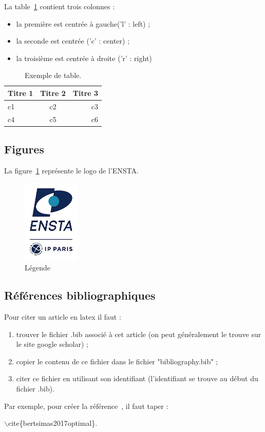 \documentclass[12pt]{report}
\begin{document}
La table~\ref{tab:ex} contient trois colonnes :
\begin{itemize}
\item la première est centrée à gauche('l' : left) ;
\item la seconde est centrée ('c' : center) ;
\item la troisième est centrée à droite ('r' : right)
\end{itemize}
\begin{table}[h!]
  \centering
\begin{tabular}{lcr}
\hline %

\textbf{Titre 1} & \textbf{Titre 2} & \textbf{Titre 3} \\
\hline

c1 & c2 & c3 \\
c4 & c5 & c6\\
\hline
\end{tabular}

\caption{Exemple de table.}
\label{tab:ex}
\end{table}


\subsection{Figures}

La figure~\ref{fig:maFigure} représente le logo de l'ENSTA.

\begin{figure}[h!]
  \centering
  \includegraphics[height=4cm]{Logo_ENSTA_Paris.png}
  \caption{Légende}
  \label{fig:maFigure}
\end{figure}

\subsection{Références bibliographiques}
 
Pour citer un article en latex il faut :
\begin{enumerate}
\item  trouver  le  fichier  .bib  associé  à  cet  article  (on  peut
  généralement le trouve sur le site google
  scholar) ;
\item   copier   le   contenu   de  ce   fichier   dans   le   fichier
  "bibliography.bib" ;
\item citer ce fichier en  utilisant son identifiant (l'identifiant se
  trouve au début du fichier .bib).
\end{enumerate}

Par  exemple, pour  créer la  référence~\cite{bertsimas2017optimal}, il
faut taper :

$\backslash$cite\{bertsimas2017optimal\}.






\end{document}
